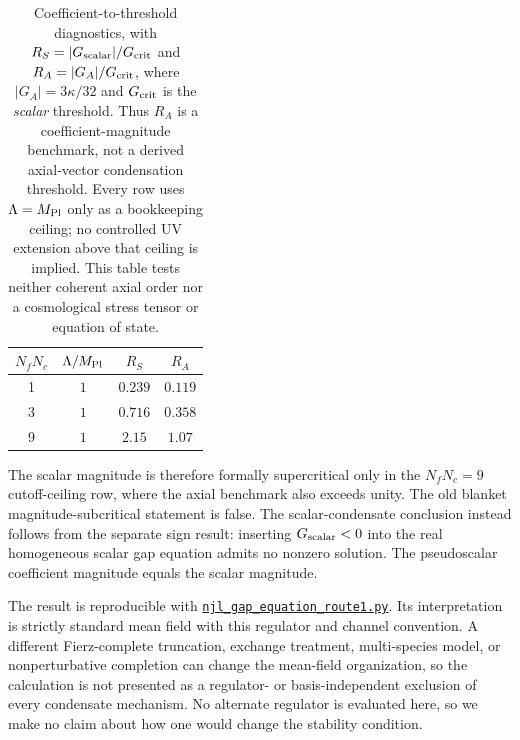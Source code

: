 \documentclass[aps,prd,twocolumn,superscriptaddress,preprintnumbers,nofootinbib,longbibliography,floatfix]{revtex4-2}
\newcommand{\artifactnamed}[2]{\href{https://github.com/Hubify-Projects/bigbounce/blob/main/#1}{\nolinkurl{#2}}}
\begin{document}
\begin{table}[tb]
\caption{Coefficient-to-threshold diagnostics, with
$R_S=|G_{\rm scalar}|/G_{\rm crit}$ and
$R_A=|G_A|/G_{\rm crit}$, where $|G_A|=3\kappa/32$ and $G_{\rm crit}$ is the
\emph{scalar} threshold.  Thus $R_A$ is a coefficient-magnitude benchmark, not
a derived axial-vector condensation threshold.  Every row uses
$\Lambda=M_{\rm Pl}$ only as a bookkeeping ceiling; no controlled UV extension
above that ceiling is implied.  This table tests neither
coherent axial order nor a cosmological stress tensor or equation of state.}
\begin{ruledtabular}
\begin{tabular}{cccc}
$N_fN_c$ & $\Lambda/M_{\rm Pl}$ & $R_S$ & $R_A$ \\
\hline
1 & $1$ & $0.239$ & $0.119$ \\
3 & $1$ & $0.716$ & $0.358$ \\
9 & $1$ & $2.15$ & $1.07$ \\
\end{tabular}
\end{ruledtabular}
\end{table}

The scalar magnitude is therefore formally supercritical only in the
$N_fN_c=9$ cutoff-ceiling row, where the axial benchmark also exceeds unity.
The old blanket
magnitude-subcritical statement is false.  The scalar-condensate conclusion
instead follows from the separate sign result: inserting
$G_{\rm scalar}<0$ into the real homogeneous scalar gap equation admits no
nonzero solution.  The pseudoscalar coefficient magnitude equals the scalar
magnitude.

The result is reproducible with
\artifactnamed{arxiv/scripts/njl_gap_equation_route1.py}{njl_gap_equation_route1.py}.  Its interpretation is
strictly standard mean field with this regulator and channel convention.  A
different Fierz-complete truncation, exchange treatment, multi-species model,
or nonperturbative completion can change the mean-field organization, so the
calculation is not presented as a regulator- or basis-independent exclusion
of every condensate mechanism.  No alternate regulator is evaluated here, so
we make no claim about how one would change the stability condition.
\end{document}
